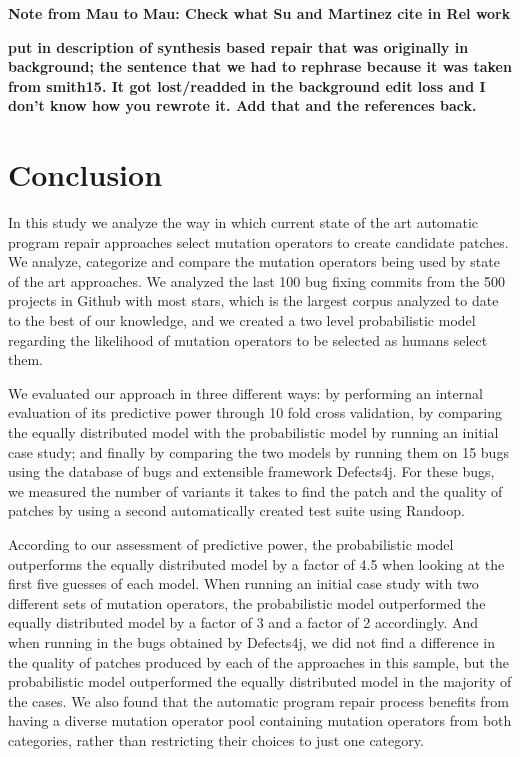 \documentclass[conference]{IEEEtran}
\newcommand{\todo}[1]
  {{\scriptsize \textbf{\color{red} {#1}}}}
\begin{document}
\todo{Note from Mau to Mau: Check what Su and Martinez cite in Rel work}

\todo{put in description of synthesis based repair that was originally in
  background; the sentence that we had to rephrase because it was taken from
  smith15.  It got lost/readded in the background edit loss and I don't know how
  you rewrote it.  Add that and the references back.}

\section{Conclusion} \label{conclusion}

In this study we analyze the way in which current state of the art automatic 
program repair approaches select mutation operators to create candidate 
patches. We analyze, categorize and compare the mutation operators being used by 
state of the art approaches. We analyzed the last 100 bug fixing commits from the
500 projects in Github with most stars, which is the largest corpus analyzed to date
to the best of our knowledge, and we created a two level probabilistic model regarding 
the likelihood of mutation operators to be selected as humans select them.

We evaluated our approach in three different ways: by performing an internal evaluation of 
its predictive power through 10 fold cross 
validation, by comparing the equally distributed model with the probabilistic
 model by running an initial case study; and finally by comparing the two models 
 by running them on 15 bugs using the database of bugs and extensible 
framework Defects4j. For these bugs, we measured the number of variants it takes to find the 
patch and the quality of patches by using a second automatically created test suite using Randoop. 

According to our assessment of predictive power, the probabilistic model outperforms
the equally distributed model by a factor of 4.5 when looking at the first five
guesses of each model. When running an initial case study with two different sets of mutation operators, the
probabilistic model outperformed the equally distributed model by a factor of 3
and a factor of 2 accordingly. And when running in the bugs obtained by
Defects4j, we did not find a difference in the quality of
patches produced by each of the approaches in this sample, but 
 the probabilistic model outperformed the equally distributed model in
the majority of the cases. We also found that the automatic program repair process benefits
from having a diverse mutation operator pool containing mutation operators from both categories,
rather than restricting their choices to just one category. 
\end{document}
